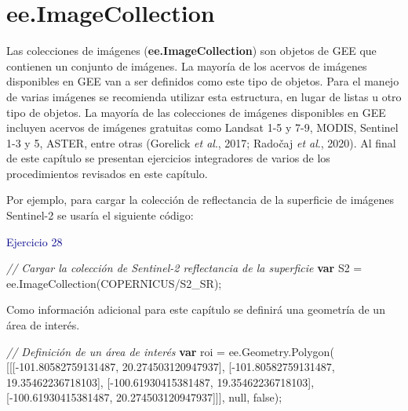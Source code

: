 \documentclass[
  12pt,
  letterpaper,
  twoside]{book}
\newenvironment{Shaded}{\begin{snugshade}}{\end{snugshade}}
\newcommand{\AttributeTok}[1]{\textcolor[rgb]{0.48,0.12,0.64}{#1}}
\newcommand{\CommentTok}[1]{\textcolor[rgb]{0.24,0.58,0.00}{\textit{#1}}}
\newcommand{\ControlFlowTok}[1]{\textcolor[rgb]{0.00,0.00,0.00}{\textbf{#1}}}
\newcommand{\FloatTok}[1]{\textcolor[rgb]{0.28,0.53,0.93}{#1}}
\newcommand{\FunctionTok}[1]{\textcolor[rgb]{0.48,0.12,0.64}{#1}}
\newcommand{\KeywordTok}[1]{\textcolor[rgb]{0.48,0.12,0.64}{#1}}
\newcommand{\NormalTok}[1]{#1}
\newcommand{\OperatorTok}[1]{\textcolor[rgb]{0.00,0.00,0.00}{#1}}
\newcommand{\StringTok}[1]{\textcolor[rgb]{0.87,0.29,0.22}{#1}}
\newcommand\boldpurple[1]{\textcolor{darkpurple}{\textbf{#1}}}
\begin{document}
\newpage

\hypertarget{ee.imagecollection-1}{%
\chapter{ee.ImageCollection}\label{ee.imagecollection-1}}

Las colecciones de imágenes (\boldpurple{ee.ImageCollection}) son objetos de GEE que contienen un conjunto de imágenes. La mayoría de los acervos de imágenes disponibles en GEE van a ser definidos como este tipo de objetos. Para el manejo de varias imágenes se recomienda utilizar esta estructura, en lugar de listas u otro tipo de objetos. La mayoría de las colecciones de imágenes disponibles en GEE incluyen acervos de imágenes gratuitas como Landsat 1-5 y 7-9, MODIS, Sentinel 1-3 y 5, ASTER, entre otras (Gorelick \emph{et al}., 2017; Radočaj \emph{et al}., 2020). Al final de este capítulo se presentan ejercicios integradores de varios de los procedimientos revisados en este capítulo.

Por ejemplo, para cargar la colección de reflectancia de la superficie de imágenes Sentinel-2 se usaría el siguiente código:

\textcolor{darkblue}{Ejercicio 28}

\begin{Shaded}
\begin{Highlighting}[]
\CommentTok{// Cargar la colección de Sentinel{-}2 reflectancia de la superficie}
\ControlFlowTok{var}\NormalTok{ S2 }\OperatorTok{=} \KeywordTok{ee}\OperatorTok{.}\FunctionTok{ImageCollection}\NormalTok{(}\StringTok{\textquotesingle{}COPERNICUS/S2\_SR\textquotesingle{}}\NormalTok{)}\OperatorTok{;}
\end{Highlighting}
\end{Shaded}

Como información adicional para este capítulo se definirá una geometría de un área de interés.

\begin{Shaded}
\begin{Highlighting}[]
\CommentTok{// Definición de un área de interés}
\ControlFlowTok{var}\NormalTok{ roi }\OperatorTok{=} \KeywordTok{ee}\OperatorTok{.}\AttributeTok{Geometry}\OperatorTok{.}\FunctionTok{Polygon}\NormalTok{(}
\NormalTok{        [[[}\OperatorTok{{-}}\FloatTok{101.80582759131487}\OperatorTok{,} \FloatTok{20.274503120947937}\NormalTok{]}\OperatorTok{,}
\NormalTok{          [}\OperatorTok{{-}}\FloatTok{101.80582759131487}\OperatorTok{,} \FloatTok{19.35462236718103}\NormalTok{]}\OperatorTok{,}
\NormalTok{          [}\OperatorTok{{-}}\FloatTok{100.61930415381487}\OperatorTok{,} \FloatTok{19.35462236718103}\NormalTok{]}\OperatorTok{,}
\NormalTok{          [}\OperatorTok{{-}}\FloatTok{100.61930415381487}\OperatorTok{,} \FloatTok{20.274503120947937}\NormalTok{]]]}\OperatorTok{,} \KeywordTok{null}\OperatorTok{,} \KeywordTok{false}\NormalTok{)}\OperatorTok{;}
\end{Highlighting}
\end{Shaded}
\end{document}
